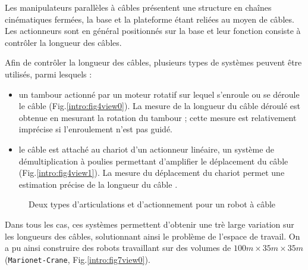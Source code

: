 Les manipulateurs parallèles à câbles présentent une structure en chaînes cinéma\-tiques fermées, la base et la plateforme étant reliées au moyen de câbles. Les actionneurs sont en général positionnés sur la base et leur fonction consiste à contrôler la longueur des câbles.

Afin de contrôler la longueur des câbles, plusieurs types de systèmes peuvent être utilisés, parmi lesquels :
\begin{itemize}
 \item un tambour actionné par un moteur rotatif sur lequel s'enroule ou se déroule le câble (Fig.\ref{intro:fig4view0}). La mesure de la longueur du câble déroulé est obtenue en mesurant la rotation du tambour ; cette mesure est relativement imprécise si l'enroulement n'est pas guidé.
 \item le câble est attaché au chariot d'un actionneur linéaire, un système de démultiplication à poulies permettant d'amplifier le déplacement du câble (Fig.\ref{intro:fig4view1}). La mesure du déplacement du chariot permet une estimation précise de la longueur du câble \cite{merlet2008}. 
\end{itemize}

\begin{figure}[!ht]
  \centering
       \hfill
    \caption{\footnotesize Deux types d'articulations et d'actionnement pour un robot à câble}
\label{intro:fig4}
\end{figure}

Dans tous les cas, ces systèmes permettent d'obtenir une trè large variation sur
les longueurs des câbles, solutionnant ainsi le problème de l'espace de travail.
On a pu ainsi construire des robots travaillant sur des volumes de
$100m\times35m\times35m$ ({\tt Marionet-Crane},
\cite{merlet2010} Fig.\ref{intro:fig7view0}).

